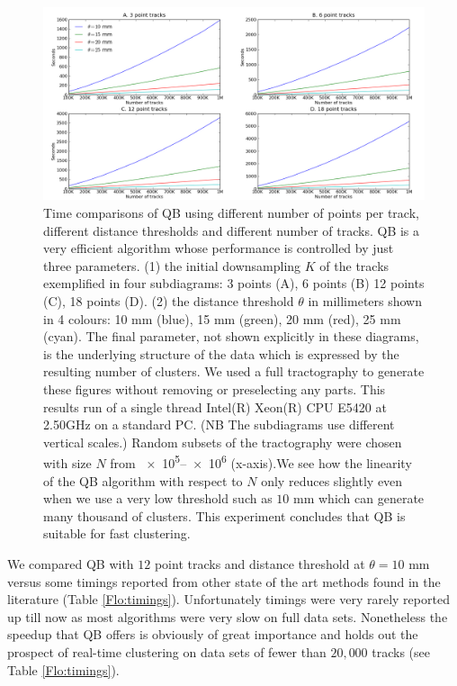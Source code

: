 \documentclass[preprint,authoryear,a4paper,10pt,onecolumn]{elsarticle}
\begin{document}
\begin{figure}
\noindent \begin{centering}
\includegraphics[scale=0.33]{2x2+leg-box}
\par\end{centering}
\caption{Time comparisons of QB using different number of points per
  track, different distance thresholds and different number of
  tracks. QB is a very efficient algorithm whose performance is
  controlled by just three parameters. (1) the initial downsampling $K$
  of the tracks exemplified in four subdiagrams: 3 points (A), 6 points
  (B) 12 points (C), 18 points (D). (2) the distance threshold $\theta$
  in millimeters shown in 4 colours: 10 mm (blue), 15 mm (green), 20 mm
  (red), 25 mm (cyan). The final parameter, not shown explicitly in
  these diagrams, is the underlying structure of the data which is
  expressed by the resulting number of clusters.  We used a full
  tractography to generate these figures without removing or
  preselecting any parts. This results run of a single thread Intel(R)
  Xeon(R) CPU E5420 at 2.50GHz on a standard PC. (NB The subdiagrams use
  different vertical scales.) Random subsets of the tractography were
  chosen with size $N$ from \numrange{e5}{e6} (x-axis).We see how the
  linearity of the QB algorithm with respect to $N$ only reduces
  slightly even when we use a very low threshold such as $10$ mm which
  can generate many thousand of clusters. This experiment concludes that
  QB is suitable for fast clustering.\label{Flo:Speed1}}
\end{figure}

We compared QB with $12$ point tracks and distance threshold at
$\theta=10$ mm versus some timings reported from other state of the art
methods found in the literature (Table \ref{Flo:timings}). Unfortunately
timings were very rarely reported up till now as most algorithms were
very slow on full data sets. Nonetheless the speedup that QB offers is
obviously of great importance and holds out the prospect of real-time
clustering on data sets of fewer than $20,000$ tracks (see
Table \ref{Flo:timings}).
\end{document}
